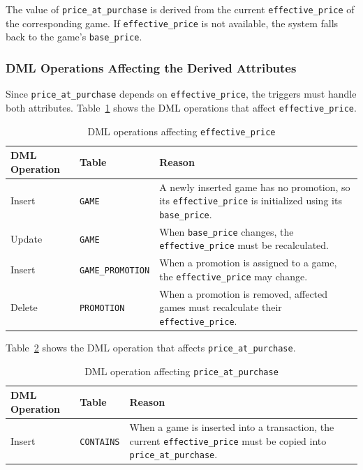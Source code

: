 The value of \texttt{price\_at\_purchase} is derived from the current \texttt{effective\_price} of the corresponding game. 
If \texttt{effective\_price} is not available, the system falls back to the game's \texttt{base\_price}.
\subsubsection{DML Operations Affecting the Derived Attributes}

Since \texttt{price\_at\_purchase} depends on \texttt{effective\_price}, the triggers must handle both attributes. 
Table~\ref{tab:dml-effective-price} shows the DML operations that affect \texttt{effective\_price}.

\begin{table}[H]
\centering
\caption{DML operations affecting \texttt{effective\_price}}
\label{tab:dml-effective-price}
\begin{tabular}{|l|l|p{8cm}|}
\hline
\textbf{DML Operation} & \textbf{Table} & \textbf{Reason} \\ \hline
Insert & \texttt{GAME} & A newly inserted game has no promotion, so its \texttt{effective\_price} is initialized using its \texttt{base\_price}. \\ \hline
Update & \texttt{GAME} & When \texttt{base\_price} changes, the \texttt{effective\_price} must be recalculated. \\ \hline
Insert & \texttt{GAME\_PROMOTION} & When a promotion is assigned to a game, the \texttt{effective\_price} may change. \\ \hline
Delete & \texttt{PROMOTION} & When a promotion is removed, affected games must recalculate their \texttt{effective\_price}. \\ \hline
\end{tabular}
\end{table}

Table~\ref{tab:dml-price-at-purchase} shows the DML operation that affects \texttt{price\_at\_purchase}.

\begin{table}[H]
\centering
\caption{DML operation affecting \texttt{price\_at\_purchase}}
\label{tab:dml-price-at-purchase}
\begin{tabular}{|l|l|p{8cm}|}
\hline
\textbf{DML Operation} & \textbf{Table} & \textbf{Reason} \\ \hline
Insert & \texttt{CONTAINS} & When a game is inserted into a transaction, the current \texttt{effective\_price} must be copied into \texttt{price\_at\_purchase}. \\ \hline
\end{tabular}
\end{table}
